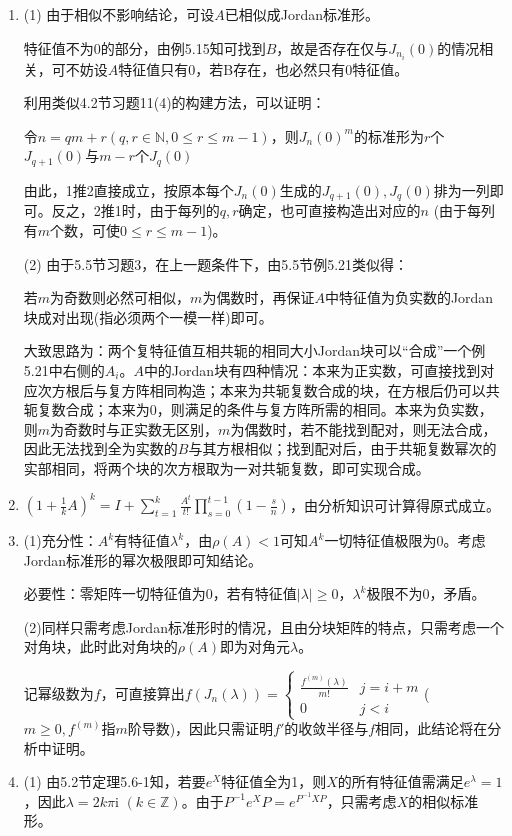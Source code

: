 \documentclass[a4paper,UTF8,fontset=windows]{ctexart}
\begin{document}
\begin{enumerate}
\item
(1) 由于相似不影响结论，可设$A$已相似成Jordan标准形。

特征值不为0的部分，由例5.15知可找到$B$，故是否存在仅与$J_{n_i}(0)$的情况相关，可不妨设$A$特征值只有0，若B存在，也必然只有0特征值。

利用类似4.2节习题11(4)的构建方法，可以证明：

令$n=qm+r(q,r\in\mathbb{N},0\le r\le m-1)$，则$J_n(0)^m$的标准形为$r$个$J_{q+1}(0)$与$m-r$个$J_q(0)$

由此，1推2直接成立，按原本每个$J_n(0)$生成的$J_{q+1}(0),J_q(0)$排为一列即可。反之，2推1时，由于每列的$q,r$确定，也可直接构造出对应的$n$ (由于每列有$m$个数，可使$0\le r\le m-1$)。

(2) 由于5.5节习题3，在上一题条件下，由5.5节例5.21类似得：

若$m$为奇数则必然可相似，$m$为偶数时，再保证$A$中特征值为负实数的Jordan块成对出现(指必须两个一模一样)即可。

大致思路为：两个复特征值互相共轭的相同大小Jordan块可以“合成”一个例5.21中右侧的$A_i$。$A$中的Jordan块有四种情况：本来为正实数，可直接找到对应次方根后与复方阵相同构造；本来为共轭复数合成的块，在方根后仍可以共轭复数合成；本来为0，则满足的条件与复方阵所需的相同。本来为负实数，则$m$为奇数时与正实数无区别，$m$为偶数时，若不能找到配对，则无法合成，因此无法找到全为实数的$B$与其方根相似；找到配对后，由于共轭复数幂次的实部相同，将两个块的次方根取为一对共轭复数，即可实现合成。

\item
$\left(1+\frac{1}{k}A\right)^k=I+\sum_{t=1}^{k}{\frac{A^t}{t!}\prod_{s=0}^{t-1}\left(1-\frac{s}{n}\right)}$，由分析知识可计算得原式成立。

\item
(1)充分性：$A^k$有特征值$\lambda^k$，由$\rho(A)<1$可知$A^k$一切特征值极限为0。考虑Jordan标准形的幂次极限即可知结论。

必要性：零矩阵一切特征值为0，若有特征值$|\lambda|\ge0$，$\lambda^k$极限不为0，矛盾。

(2)同样只需考虑Jordan标准形时的情况，且由分块矩阵的特点，只需考虑一个对角块，此时此对角块的$\rho(A)$即为对角元$\lambda$。

记幂级数为$f$，可直接算出$f(J_n(\lambda))=\begin{cases}\frac{f^{(m)}(\lambda)}{m!}&j=i+m\\0&j<i\end{cases}$($m\ge0,f^{(m)}$指$m$阶导数)，因此只需证明$f'$的收敛半径与$f$相同，此结论将在分析中证明。

\item
(1) 由5.2节定理5.6-1知，若要$e^X$特征值全为1，则$X$的所有特征值需满足$e^\lambda=1$，因此$\lambda=2k\pi\mathrm{i}$ $(k\in\mathbb{Z})$。由于$P^{-1}e^XP=e^{P^{-1}XP}$，只需考虑$X$的相似标准形。


\end{enumerate}
\end{document}
